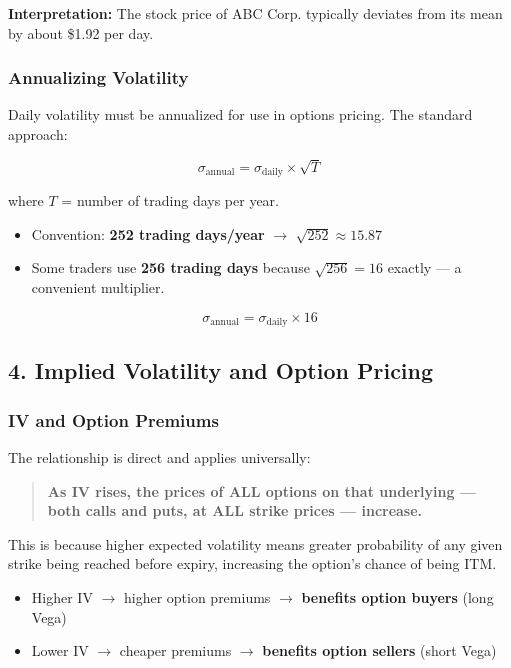 \documentclass[12pt,openany]{book}
\begin{document}
\textbf{Interpretation:} The stock price of ABC Corp. typically deviates from its mean by about \$1.92 per day.

\subsubsection{Annualizing Volatility}

Daily volatility must be annualized for use in options pricing. The standard approach:

\[
\sigma_{\text{annual}} = \sigma_{\text{daily}} \times \sqrt{T}
\]

where \(T\) = number of trading days per year.

\begin{itemize}[leftmargin=*]
    \item Convention: \textbf{252 trading days/year} \(\rightarrow\) \(\sqrt{252} \approx 15.87\)
    \item Some traders use \textbf{256 trading days} because \(\sqrt{256} = 16\) exactly — a convenient multiplier.
\end{itemize}

\[
\boxed{\sigma_{\text{annual}} = \sigma_{\text{daily}} \times 16}
\]

\subsection{4. Implied Volatility and Option Pricing}

\subsubsection{IV and Option Premiums}

The relationship is direct and applies universally:

\begin{quote}
\textbf{As IV rises, the prices of ALL options on that underlying — both calls and puts, at ALL strike prices — increase.}
\end{quote}

This is because higher expected volatility means greater probability of any given strike being reached before expiry, increasing the option's chance of being ITM.

\begin{itemize}[leftmargin=*]
    \item Higher IV \(\rightarrow\) higher option premiums \(\rightarrow\) \textbf{benefits option buyers} (long Vega)
    \item Lower IV \(\rightarrow\) cheaper premiums \(\rightarrow\) \textbf{benefits option sellers} (short Vega)
\end{itemize}
\end{document}
